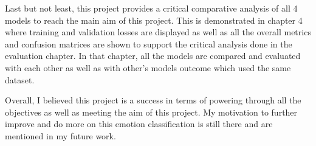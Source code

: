 Last but not least, this project provides a critical comparative analysis of all 4 models to reach the main aim of this project. This is demonstrated in chapter 4 where training and validation losses are displayed as well as all the overall metrics and confusion matrices are shown to support the critical analysis done in the evaluation chapter. In that chapter, all the models are compared and evaluated with each other as well as with other's models outcome which used the same dataset.

Overall, I believed this project is a success in terms of powering through all the objectives as well as meeting the aim of this project. My motivation to further improve and do more on this emotion classification is still there and are mentioned in my future work.
